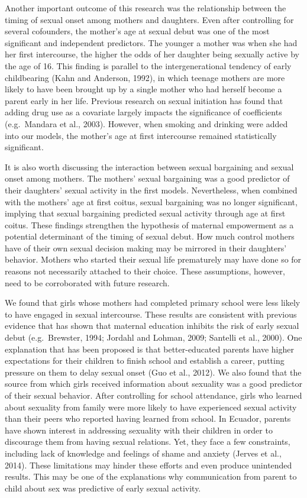 \documentclass[
]{article}
\begin{document}
Another important outcome of this research was the relationship between
the timing of sexual onset among mothers and daughters. Even after
controlling for several cofounders, the mother's age at sexual debut was
one of the most significant and independent predictors. The younger a
mother was when she had her first intercourse, the higher the odds of
her daughter being sexually active by the age of 16. This finding is
parallel to the intergenerational tendency of early childbearing (Kahn
and Anderson, 1992), in which teenage mothers are more likely to have
been brought up by a single mother who had herself become a parent early
in her life. Previous research on sexual initiation has found that
adding drug use as a covariate largely impacts the significance of
coefficients (e.g.~Mandara et al., 2003). However, when smoking and
drinking were added into our models, the mother's age at first
intercourse remained statistically significant.

It is also worth discussing the interaction between sexual bargaining
and sexual onset among mothers. The mothers' sexual bargaining was a
good predictor of their daughters' sexual activity in the first models.
Nevertheless, when combined with the mothers' age at first coitus,
sexual bargaining was no longer significant, implying that sexual
bargaining predicted sexual activity through age at first coitus. These
findings strengthen the hypothesis of maternal empowerment as a
potential determinant of the timing of sexual debut. How much control
mothers have of their own sexual decision making may be mirrored in
their daughters' behavior. Mothers who started their sexual life
prematurely may have done so for reasons not necessarily attached to
their choice. These assumptions, however, need to be corroborated with
future research.

We found that girls whose mothers had completed primary school were less
likely to have engaged in sexual intercourse. These results are
consistent with previous evidence that has shown that maternal education
inhibits the risk of early sexual debut (e.g.~Brewster, 1994; Jordahl
and Lohman, 2009; Santelli et al., 2000). One explanation that has been
proposed is that better-educated parents have higher expectations for
their children to finish school and establish a career, putting pressure
on them to delay sexual onset (Guo et al., 2012). We also found that the
source from which girls received information about sexuality was a good
predictor of their sexual behavior. After controlling for school
attendance, girls who learned about sexuality from family were more
likely to have experienced sexual activity than their peers who reported
having learned from school. In Ecuador, parents have shown interest in
addressing sexuality with their children in order to discourage them
from having sexual relations. Yet, they face a few constraints,
including lack of knowledge and feelings of shame and anxiety (Jerves et
al., 2014). These limitations may hinder these efforts and even produce
unintended results. This may be one of the explanations why
communication from parent to child about sex was predictive of early
sexual activity.
\end{document}
